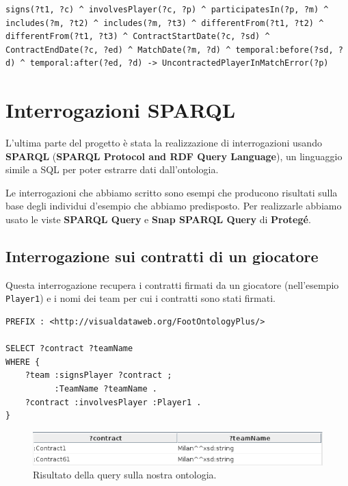 \documentclass[11pt]{report} %
\begin{document}
\begin{lstlisting}[language=SWRL]
signs(?t1, ?c) ^ involvesPlayer(?c, ?p) ^ participatesIn(?p, ?m) ^ includes(?m, ?t2) ^ includes(?m, ?t3) ^ differentFrom(?t1, ?t2) ^ differentFrom(?t1, ?t3) ^ ContractStartDate(?c, ?sd) ^ ContractEndDate(?c, ?ed) ^ MatchDate(?m, ?d) ^ temporal:before(?sd, ?d) ^ temporal:after(?ed, ?d) -> UncontractedPlayerInMatchError(?p)
\end{lstlisting}
\chapter{Interrogazioni SPARQL}

L'ultima parte del progetto è stata la realizzazione di interrogazioni usando \textbf{SPARQL} (\textbf{SPARQL Protocol and RDF Query Language}), un linguaggio simile a SQL per poter estrarre dati dall'ontologia.

\hfill

Le interrogazioni che abbiamo scritto sono esempi che producono risultati sulla base degli individui d'esempio che abbiamo predisposto. 
Per realizzarle abbiamo usato le viste \textbf{SPARQL Query} e \textbf{Snap SPARQL Query} di \textbf{Protegé}. 

\section{Interrogazione sui contratti di un giocatore}

Questa interrogazione recupera i contratti firmati da un giocatore (nell'esempio \texttt{Player1}) e i nomi dei team per cui i contratti sono stati firmati. 

\begin{lstlisting}
PREFIX : <http://visualdataweb.org/FootOntologyPlus/>

SELECT ?contract ?teamName
WHERE { 
    ?team :signsPlayer ?contract ;
          :TeamName ?teamName .
    ?contract :involvesPlayer :Player1 .
}
\end{lstlisting}

\begin{figure}[H]
	\includegraphics[width=\textwidth]{query1}
	\caption{Risultato della query sulla nostra ontologia.}
\end{figure}

\newpage
\end{document}
